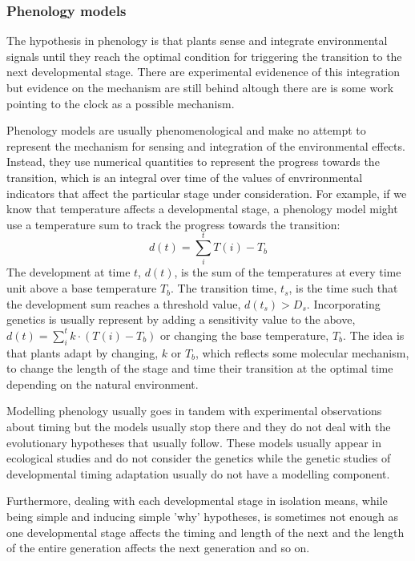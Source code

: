 \documentclass[phd]{infthesis}
\begin{document}
\subsubsection*{Phenology models}
The hypothesis in phenology is that plants sense and integrate environmental
signals until they reach the optimal condition for triggering the transition to
the next developmental stage. There are experimental evidenence of this
integration but evidence on the mechanism are still behind altough there are is
some work pointing to the clock as a possible mechanism.

Phenology models are usually phenomenological and make no attempt to represent
the mechanism for sensing and integration of the environmental effects. Instead,
they use numerical quantities to represent the progress towards the transition,
which is an integral over time of the values of envrironmental indicators that
affect the particular stage under consideration. For example, if we know that
temperature affects a developmental stage, a phenology model might use a
temperature sum to track the progress towards the transition:
$$
d(t) = \sum_{i}^{t} T(i) - T_b
$$
The development at time $t$, $d(t)$, is the sum of the temperatures at every
time unit above a base temperature $T_b$. The transition time, $t_s$, is the
time such that the development sum reaches a threshold value, $d(t_s) >
D_s$. Incorporating genetics is usually represent by adding a sensitivity value
to the above, $ d(t) = \sum_{i}^{t} k \cdot (T(i) - T_b)$ or changing the base temperature,
$T_b$. The idea is that plants adapt by changing, $k$ or $T_b$, which reflects
some molecular mechanism, to change the length of the stage and time their
transition at the optimal time depending on the natural environment.

Modelling phenology usually goes in tandem with experimental observations about
timing but the models usually stop there and they do not deal with the
evolutionary hypotheses that usually follow. These models usually appear in
ecological studies and do not consider the genetics while the genetic studies of
developmental timing adaptation usually do not have a modelling component.

Furthermore, dealing with each developmental stage in isolation means, while
being simple and inducing simple 'why' hypotheses, is sometimes not enough as one
developmental stage affects the timing and length of the next and the length of
the entire generation affects the next generation and so on.
\end{document}
